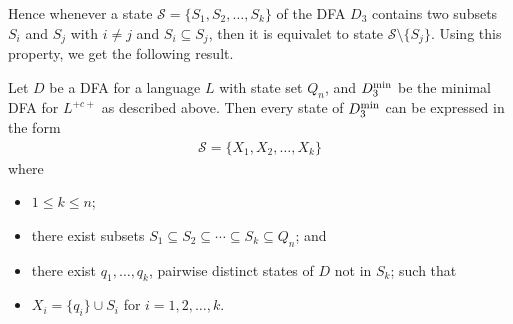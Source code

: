 \documentclass[runningheads]{llncs}
\begin{document}
Hence whenever a state $\mathcal{S}=\big\{ S_1,S_2,\ldots,S_k\}$ of the DFA $D_3$
contains two subsets $S_i$ and $S_j$ with $i\neq j$ and $S_i\subseteq S_j$,
then it is equivalet to state $\mathcal{S}\setminus \{S_j\}$.
Using this property, we get the following result.

\begin{lemma}\label{-----le2}\label{le:express}
 Let $D$ be a DFA for a language $L$ with state set $Q_n$,
 and $D_3^{\rm min}$ be the minimal DFA for $L^{+c+}$ as described above.
 Then every  state of $D_3^{\rm min}$
 can be expressed in the form
\begin{align}
 \mathcal{S}=\{X_1,X_2,\ldots,X_k\}
\label{eq1}
\end{align}
where
 \begin{itemize}
 \item  $1\le k\le n$;
\item there exist subsets 
$S_1\subseteq S_2\subseteq \cdots  \subseteq S_k\subseteq Q_n$; and
\item there exist $q_1,\ldots,q_k$, pairwise distinct states of $D$
            not in $S_k$; such that
\item $X_i=\{q_i\}\cup S_i$  for $i=1,2,\ldots,k$.
\end{itemize}
\end{lemma}
\end{document}
